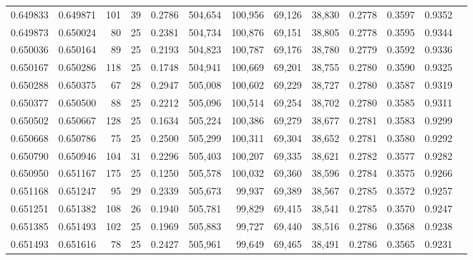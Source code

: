 \begin{tabular}{rrrrrrrrrrrrr}
0.649833 & 0.649871 &   101 &  39 &                                     0.2786 & 504,654 & 100,956 &  69,126 &  38,830 & 0.2778 & 0.3597 & 0.9352 \\
0.649873 & 0.650024 &    80 &  25 &                                     0.2381 & 504,734 & 100,876 &  69,151 &  38,805 & 0.2778 & 0.3595 & 0.9344 \\
0.650036 & 0.650164 &    89 &  25 &                                     0.2193 & 504,823 & 100,787 &  69,176 &  38,780 & 0.2779 & 0.3592 & 0.9336 \\
0.650167 & 0.650286 &   118 &  25 &                                     0.1748 & 504,941 & 100,669 &  69,201 &  38,755 & 0.2780 & 0.3590 & 0.9325 \\
0.650288 & 0.650375 &    67 &  28 &                                     0.2947 & 505,008 & 100,602 &  69,229 &  38,727 & 0.2780 & 0.3587 & 0.9319 \\
0.650377 & 0.650500 &    88 &  25 &                                     0.2212 & 505,096 & 100,514 &  69,254 &  38,702 & 0.2780 & 0.3585 & 0.9311 \\
0.650502 & 0.650667 &   128 &  25 &                                     0.1634 & 505,224 & 100,386 &  69,279 &  38,677 & 0.2781 & 0.3583 & 0.9299 \\
0.650668 & 0.650786 &    75 &  25 &                                     0.2500 & 505,299 & 100,311 &  69,304 &  38,652 & 0.2781 & 0.3580 & 0.9292 \\
0.650790 & 0.650946 &   104 &  31 &                                     0.2296 & 505,403 & 100,207 &  69,335 &  38,621 & 0.2782 & 0.3577 & 0.9282 \\
0.650950 & 0.651167 &   175 &  25 &                                     0.1250 & 505,578 & 100,032 &  69,360 &  38,596 & 0.2784 & 0.3575 & 0.9266 \\
0.651168 & 0.651247 &    95 &  29 &                                     0.2339 & 505,673 &  99,937 &  69,389 &  38,567 & 0.2785 & 0.3572 & 0.9257 \\
0.651251 & 0.651382 &   108 &  26 &                                     0.1940 & 505,781 &  99,829 &  69,415 &  38,541 & 0.2785 & 0.3570 & 0.9247 \\
0.651385 & 0.651493 &   102 &  25 &                                     0.1969 & 505,883 &  99,727 &  69,440 &  38,516 & 0.2786 & 0.3568 & 0.9238 \\
0.651493 & 0.651616 &    78 &  25 &                                     0.2427 & 505,961 &  99,649 &  69,465 &  38,491 & 0.2786 & 0.3565 & 0.9231 \\

\end{tabular}
